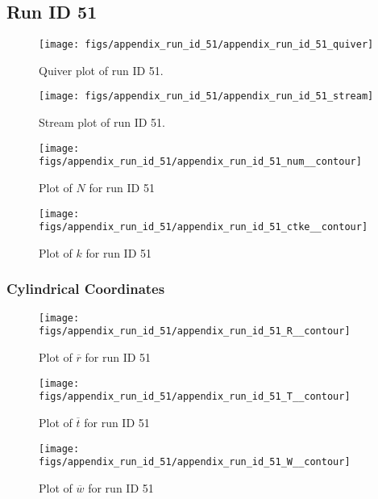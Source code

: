 \subsection{Run ID 51}
\begin{figure}[H]
\centering
\texttt{[image: figs/appendix\_run\_id\_51/appendix\_run\_id\_51\_quiver]}
\caption{Quiver plot of run ID 51.}
\label{fig:appendix_run_id_51_quiver}
\end{figure}


\begin{figure}[H]
\centering
\texttt{[image: figs/appendix\_run\_id\_51/appendix\_run\_id\_51\_stream]}
\caption{Stream plot of run ID 51.}
\label{fig:appendix_run_id_51_stream}
\end{figure}


\begin{figure}[H]
\centering
\texttt{[image: figs/appendix\_run\_id\_51/appendix\_run\_id\_51\_num\_\_contour]}
\caption{Plot of $N$ for run ID 51}
\label{fig:appendix_run_id_51_num__contour}
\end{figure}


\begin{figure}[H]
\centering
\texttt{[image: figs/appendix\_run\_id\_51/appendix\_run\_id\_51\_ctke\_\_contour]}
\caption{Plot of $k$ for run ID 51}
\label{fig:appendix_run_id_51_ctke__contour}
\end{figure}


\subsubsection{Cylindrical Coordinates}
\begin{figure}[H]
\centering
\texttt{[image: figs/appendix\_run\_id\_51/appendix\_run\_id\_51\_R\_\_contour]}
\caption{Plot of $\overline{r}$ for run ID 51}
\label{fig:appendix_run_id_51_R__contour}
\end{figure}


\begin{figure}[H]
\centering
\texttt{[image: figs/appendix\_run\_id\_51/appendix\_run\_id\_51\_T\_\_contour]}
\caption{Plot of $\overline{t}$ for run ID 51}
\label{fig:appendix_run_id_51_T__contour}
\end{figure}


\begin{figure}[H]
\centering
\texttt{[image: figs/appendix\_run\_id\_51/appendix\_run\_id\_51\_W\_\_contour]}
\caption{Plot of $\overline{w}$ for run ID 51}
\label{fig:appendix_run_id_51_W__contour}
\end{figure}


